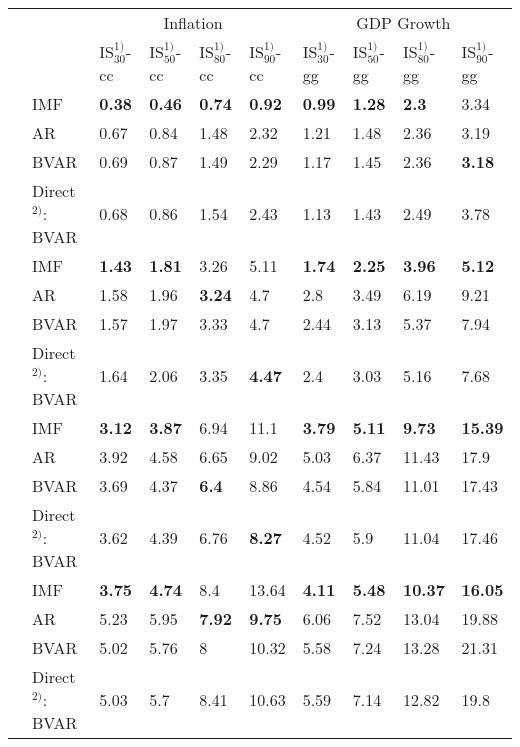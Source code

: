 \begin{table}[!h]
\centering
\begin{tabular}{llllllllll}
\toprule
\multicolumn{2}{c}{ } & \multicolumn{4}{c}{{Inflation}} & \multicolumn{4}{c}{{GDP Growth}} \\
\cmidrule(l{3pt}r{3pt}){3-6} \cmidrule(l{3pt}r{3pt}){7-10}
 &  & $\text{IS}_{30}^{1)}$-cc & $\text{IS}_{50}^{1)}$-cc & $\text{IS}_{80}^{1)}$-cc & $\text{IS}_{90}^{1)}$-cc & $\text{IS}_{30}^{1)}$-gg & $\text{IS}_{50}^{1)}$-gg & $\text{IS}_{80}^{1)}$-gg & $\text{IS}_{90}^{1)}$-gg\\
\midrule
 & IMF & \textbf{0.38} & \textbf{0.46} & \textbf{0.74} & \textbf{0.92} & \textbf{0.99} & \textbf{1.28} & \textbf{2.3} & 3.34\\
\parbox[t]{2mm}{}
 & AR & 0.67 & 0.84 & 1.48 & 2.32 & 1.21 & 1.48 & 2.36 & 3.19\\
 & BVAR & 0.69 & 0.87 & 1.49 & 2.29 & 1.17 & 1.45 & 2.36 & \textbf{3.18}\\
 & Direct$^{2)}$: BVAR & 0.68 & 0.86 & 1.54 & 2.43 & 1.13 & 1.43 & 2.49 & 3.78\\
\addlinespace
 & IMF & \textbf{1.43} & \textbf{1.81} & 3.26 & 5.11 & \textbf{1.74} & \textbf{2.25} & \textbf{3.96} & \textbf{5.12}\\
\parbox[t]{2mm}{}
 & AR & 1.58 & 1.96 & \textbf{3.24} & 4.7 & 2.8 & 3.49 & 6.19 & 9.21\\
 & BVAR & 1.57 & 1.97 & 3.33 & 4.7 & 2.44 & 3.13 & 5.37 & 7.94\\
 & Direct$^{2)}$: BVAR & 1.64 & 2.06 & 3.35 & \textbf{4.47} & 2.4 & 3.03 & 5.16 & 7.68\\
\addlinespace
 & IMF & \textbf{3.12} & \textbf{3.87} & 6.94 & 11.1 & \textbf{3.79} & \textbf{5.11} & \textbf{9.73} & \textbf{15.39}\\
\parbox[t]{2mm}{}
 & AR & 3.92 & 4.58 & 6.65 & 9.02 & 5.03 & 6.37 & 11.43 & 17.9\\
 & BVAR & 3.69 & 4.37 & \textbf{6.4} & 8.86 & 4.54 & 5.84 & 11.01 & 17.43\\
 & Direct$^{2)}$: BVAR & 3.62 & 4.39 & 6.76 & \textbf{8.27} & 4.52 & 5.9 & 11.04 & 17.46\\
\addlinespace
 & IMF & \textbf{3.75} & \textbf{4.74} & 8.4 & 13.64 & \textbf{4.11} & \textbf{5.48} & \textbf{10.37} & \textbf{16.05}\\
\parbox[t]{2mm}{}
 & AR & 5.23 & 5.95 & \textbf{7.92} & \textbf{9.75} & 6.06 & 7.52 & 13.04 & 19.88\\
 & BVAR & 5.02 & 5.76 & 8 & 10.32 & 5.58 & 7.24 & 13.28 & 21.31\\
 & Direct$^{2)}$: BVAR & 5.03 & 5.7 & 8.41 & 10.63 & 5.59 & 7.14 & 12.82 & 19.8\\
\bottomrule
\end{tabular}
\end{table}
